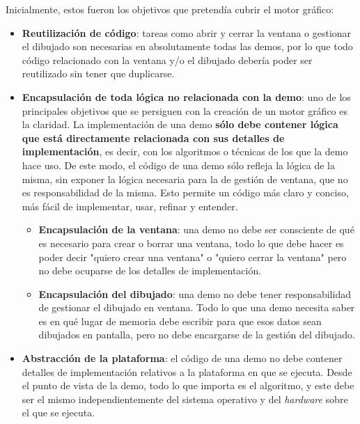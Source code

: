 Inicialmente, estos fueron los objetivos que pretendía cubrir el motor gráfico:
\begin{itemize}
	\item \textbf{Reutilización de código}: tareas como abrir y cerrar la ventana o gestionar el dibujado son necesarias en absolutamente todas las demos, por lo que todo código relacionado con la ventana y/o el dibujado debería poder ser reutilizado sin tener que duplicarse.
	\item \textbf{Encapsulación de toda lógica no relacionada con la demo}: uno de los principales objetivos que se persiguen con la creación de un motor gráfico es la claridad. La implementación de una demo \textbf{sólo debe contener lógica que está directamente relacionada con sus detalles de implementación}, es decir, con los algoritmos o técnicas de los que la demo hace uso. De este modo, el código de una demo sólo refleja la lógica de la misma, sin exponer la lógica necesaria para la de gestión de ventana, que no es responsabilidad de la misma. Esto permite un código más claro y conciso, más fácil de implementar, usar, refinar y entender.
		\begin{itemize}
			\item \textbf{Encapsulación de la ventana}: una demo no debe ser consciente de qué es necesario para crear o borrar una ventana, todo lo que debe hacer es poder decir "quiero crear una ventana" o "quiero cerrar la ventana" pero no debe ocuparse de los detalles de implementación.
			\item \textbf{Encapsulación del dibujado}: una demo no debe tener responsabilidad de gestionar el dibujado en ventana. Todo lo que una demo necesita saber es en qué lugar de memoria debe escribir para que esos datos sean dibujados en pantalla, pero no debe encargarse de la gestión del dibujado.
		\end{itemize}
	\item \textbf{Abstracción de la plataforma}: el código de una demo no debe contener detalles de implementación relativos a la plataforma en que se ejecuta. Desde el punto de vista de la demo, todo lo que importa es el algoritmo, y este debe ser el mismo independientemente del sistema operativo y del \emph{hardware} sobre el que se ejecuta.
\end{itemize}

